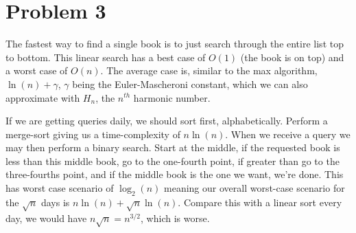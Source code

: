 \documentclass{article}
\begin{document}
    \section*{Problem 3}
        The fastest way to find a single book is to just search through the entire list top to bottom.
        This linear search has a best case of $O(1)$ (the book is on top) and a worst case of $O(n)$.
        The average case is, similar to the max algorithm, $\ln(n)+\gamma$, $\gamma$ being the
        Euler-Mascheroni constant, which we can also approximate with $H_{n}$, the $n^{th}$ harmonic
        number.
        \par\hfill\par
        If we are getting queries daily, we should sort first, alphabetically. Perform a merge-sort
        giving us a time-complexity of $n\ln(n)$. When we receive a query we may then perform a
        binary search. Start at the middle, if the requested book is less than this middle book,
        go to the one-fourth point, if greater than go to the three-fourths point, and if the
        middle book is the one we want, we're done. This has worst case scenario of $\log_{2}(n)$
        meaning our overall worst-case scenario for the $\sqrt{n}$ days is $n\ln(n)+\sqrt{n}\ln(n)$.
        Compare this with a linear sort every day, we would have $n\sqrt{n}=n^{3/2}$, which is worse.
\end{document}
